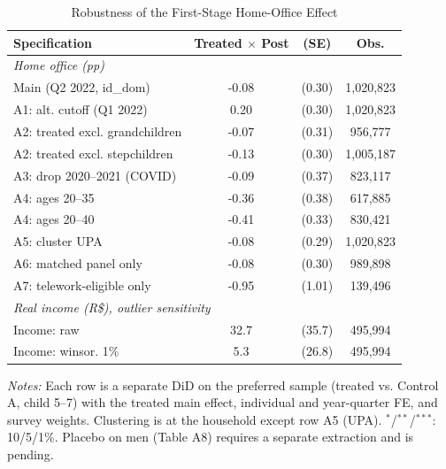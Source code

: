 \begin{table}[htbp]\centering
\caption{Robustness of the First-Stage Home-Office Effect}
\label{tab:robustness}\small
\begin{tabular}{lccc}
\toprule
Specification & Treated $\times$ Post & (SE) & Obs. \\
\midrule
\multicolumn{4}{l}{\textit{Home office (pp)}} \\
Main (Q2 2022, id\_dom) & -0.08$^{}$ & (0.30) & 1,020,823 \\
A1: alt. cutoff (Q1 2022) & 0.20$^{}$ & (0.30) & 1,020,823 \\
A2: treated excl. grandchildren & -0.07$^{}$ & (0.31) & 956,777 \\
A2: treated excl. stepchildren & -0.13$^{}$ & (0.30) & 1,005,187 \\
A3: drop 2020--2021 (COVID) & -0.09$^{}$ & (0.37) & 823,117 \\
A4: ages 20--35 & -0.36$^{}$ & (0.38) & 617,885 \\
A4: ages 20--40 & -0.41$^{}$ & (0.33) & 830,421 \\
A5: cluster UPA & -0.08$^{}$ & (0.29) & 1,020,823 \\
A6: matched panel only & -0.08$^{}$ & (0.30) & 989,898 \\
A7: telework-eligible only & -0.95$^{}$ & (1.01) & 139,496 \\
\midrule
\multicolumn{4}{l}{\textit{Real income (R\$), outlier sensitivity}} \\
Income: raw & 32.7$^{}$ & (35.7) & 495,994 \\
Income: winsor. 1\% & 5.3$^{}$ & (26.8) & 495,994 \\
\bottomrule\end{tabular}
\begin{tablenotes}\small
\item \textit{Notes:} Each row is a separate DiD on the preferred sample (treated vs. Control A, child 5--7) with the treated main effect, individual and year-quarter FE, and survey weights. Clustering is at the household except row A5 (UPA). $^{*}$/$^{**}$/$^{***}$: 10/5/1\%. Placebo on men (Table A8) requires a separate extraction and is pending.
\end{tablenotes}\end{table}
